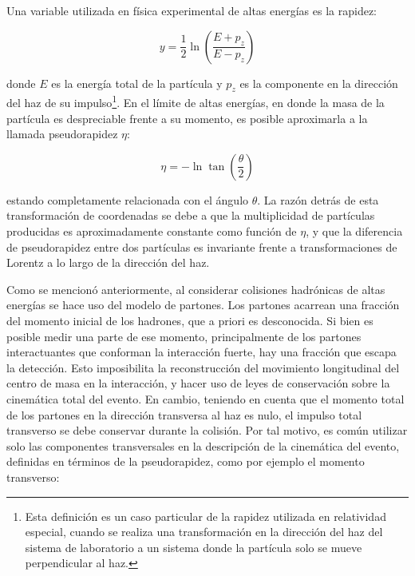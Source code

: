 Una variable utilizada en física experimental de altas energías es la rapidez:

\begin{equation}
y=\frac{1}{2}\ln\left( \frac{E+p_{z}}{E-p_{z}}\right)
\end{equation}

\noindent
donde $E$ es la energía total de la partícula y $p_{z}$ es la componente en la dirección del haz de su impulso\footnote{Esta definición es un caso particular de la rapidez utilizada en relatividad especial, cuando se realiza una transformación en la dirección del haz del sistema de laboratorio a un sistema donde la partícula solo se mueve perpendicular al haz.}. En el límite de altas energías, en donde la masa de la partícula es despreciable frente a su momento, es posible aproximarla a la llamada pseudorapidez $\eta$:

\begin{equation}
\eta =-\ln \tan\left( \frac{\theta}{2} \right)
\end{equation}

\noindent
estando completamente relacionada con el ángulo $\theta$. La razón detrás de esta transformación de coordenadas se debe a que
 la multiplicidad de partículas producidas es aproximadamente constante como función de $\eta$, y que 
 la diferencia de pseudorapidez entre dos partículas es invariante frente a transformaciones de Lorentz a lo largo de la dirección del haz. 


Como se mencionó anteriormente, al considerar colisiones hadrónicas de altas energías se hace uso del modelo de partones. Los partones acarrean una fracción del momento inicial de los hadrones, que a priori es desconocida. Si bien es posible medir una parte de ese momento, principalmente de los partones interactuantes que conforman la interacción fuerte, hay una fracción que escapa la detección. Esto imposibilita la reconstrucción del movimiento longitudinal del centro de masa en la interacción, y hacer uso de leyes de conservación sobre la cinemática total del evento. En cambio, teniendo en cuenta que el momento total de los partones en la dirección transversa al haz es nulo, el impulso total transverso se debe conservar durante la colisión. Por tal motivo, es común utilizar solo las componentes transversales en la descripción de la cinemática del evento, definidas en términos de la pseudorapidez, como por ejemplo el momento transverso:

